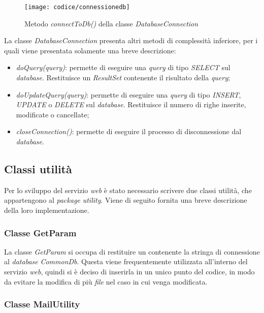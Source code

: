 \begin{figure}[!h] 
    \centering 
    \texttt{[image: codice/connessionedb]} 
    \caption{Metodo \textit{connectToDb()} della classe \textit{DatabaseConnection}}
\end{figure}

La classe \textit{DatabaseConnection} presenta altri metodi di complessità inferiore, per i quali viene presentata solamente una breve descrizione:
\begin{itemize}
	\item \textit{doQuery(query)}: permette di eseguire una \textit{query} di tipo \textit{SELECT} sul \textit{database}. Restituisce un \textit{ResultSet} contenente il risultato della \textit{query};
	\item \textit{doUpdateQuery(query)}: permette di eseguire una \textit{query} di tipo \textit{INSERT}, \textit{UPDATE} o \textit{DELETE} sul \textit{database}. Restituisce il numero di righe inserite, modificate o cancellate;
	\item \textit{closeConnection()}: permette di eseguire il processo di disconnessione dal \textit{database}.
\end{itemize}

\subsection{Classi utilità}

Per lo sviluppo del servizio \textit{web} è stato necessario scrivere due classi utilità, che appartengono al \textit{package} \textit{utility}. Viene di seguito fornita una breve descrizione della loro implementazione.

\subsubsection{Classe GetParam}

La classe \textit{GetParam} si occupa di restituire un  contenente la stringa di connessione al \textit{database} \textit{CommonDb}. Questa viene frequentemente utilizzata all'interno del servizio \textit{web}, quindi si è deciso di inserirla in un unico punto del codice, in modo da evitare la modifica di più \textit{file} nel caso in cui venga modificata.

\subsubsection{Classe MailUtility}

